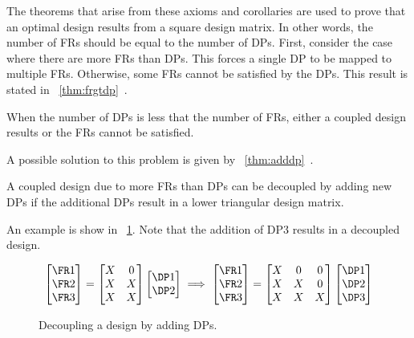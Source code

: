 The theorems that arise from these axioms and corollaries are used to prove that an optimal design results from a
square design matrix.  In other words, the number of FRs should be equal to the number of DPs.  First, consider the
case where there are more FRs than DPs.  This forces a single DP to be mapped to multiple FRs.  Otherwise, some FRs
cannot be satisfied by the DPs.  This result is stated in \theoremname~\ref{thm:frgtdp}~\cite{suh}.

\begin{theorem}
  \label{thm:frgtdp}
  When the number of DPs is less that the number of FRs, either a coupled design results or the FRs cannot be
  satisfied.
\end{theorem}

A possible solution to this problem is given by \theoremname~\ref{thm:adddp}~\cite{suh}.
\begin{theorem}
  \label{thm:adddp}
  A coupled design due to more FRs than DPs can be decoupled by adding new DPs if the additional DPs result in a
  lower triangular design matrix.
\end{theorem}

An example is show in \figurename~\ref{fig:dcexample}.  Note that the addition of DP3 results in a decoupled design.

\begin{figure}[H]
  \[\begin{bmatrix}
  \FR1 \\ \FR2 \\ \FR3
  \end{bmatrix}=\begin{bmatrix}
  X & 0 \\
  X & X \\
  X & X \\
  \end{bmatrix}\begin{bmatrix}
    \DP1 \\ \DP2 \\
  \end{bmatrix}\implies\begin{bmatrix}
  \FR1 \\ \FR2 \\ \FR3
  \end{bmatrix}=\begin{bmatrix}
  X & 0 & 0 \\
  X & X & 0 \\
  X & X & X \\
  \end{bmatrix}\begin{bmatrix}
    \DP1 \\ \DP2 \\ \DP3
  \end{bmatrix}\]
  \vspace{-\baselineskip}
  \caption{Decoupling a design by adding DPs.}
  \label{fig:dcexample}
\end{figure}

